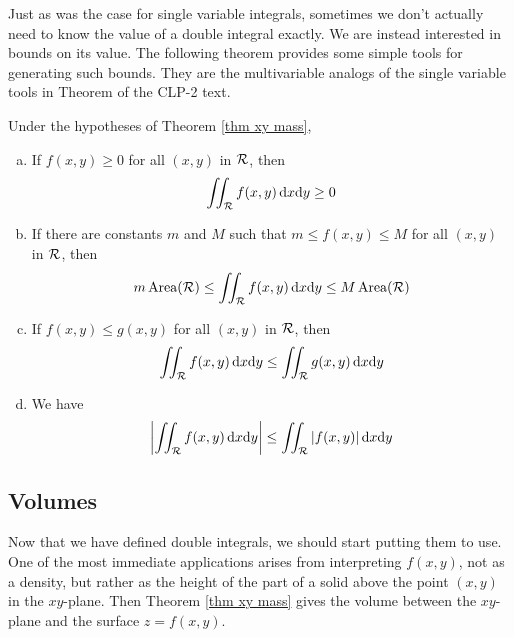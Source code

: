 Just as was the case for single variable integrals, sometimes we don't
actually need to know the value of a double integral exactly. We are
instead interested in bounds on its value. 
The following theorem provides some simple tools for generating such bounds.
They are the multivariable analogs of the single variable tools in
Theorem  of the CLP-2 text.  


\begin{theorem}\label{thm:INT2dineq}
Under the hypotheses of Theorem \ref{thm xy mass},
\begin{enumerate}[(a)]
\item 
If $f(x,y)\ge 0$ for all $(x,y)$ in $\mathcal{R}$, then
\begin{align*}
\iint_{\mathcal{R}} f(x,y)\,\mathrm{d}x\mathrm{d}y \ge 0
\end{align*}
\item 
If there are constants $m$ and $M$ such that  $m\le f(x,y)\le M$ 
for all $(x,y)$ in $\mathcal{R}$, then
\begin{align*}
m\,\text{Area}(\mathcal{R})\le \iint_{\mathcal{R}} f(x,y)\,\mathrm{d}x\mathrm{d}y 
                                   \le M\,\text{Area}(\mathcal{R})
\end{align*}
\item If $f(x,y)\le g(x,y)$ for all $(x,y)$ in $\mathcal{R}$, then
\begin{align*}
\iint_{\mathcal{R}} f(x,y)\,\mathrm{d}x\mathrm{d}y \le \iint_{\mathcal{R}} g(x,y)\,\mathrm{d}x\mathrm{d}y
\end{align*}
\item We have
\begin{align*}
\left|\iint_{\mathcal{R}} f(x,y)\,\mathrm{d}x\mathrm{d}y\right|
          \le \iint_{\mathcal{R}} |f(x,y)|\,\mathrm{d}x\mathrm{d}y
\end{align*}
\end{enumerate}
\end{theorem}




\subsection{Volumes}

Now that we have defined double integrals, we should start putting them to use.
One of the most immediate applications arises from interpreting $f(x,y)$,
not as a density, but rather as the height of the part of a solid above the 
point $(x,y)$ in the $xy$-plane. Then Theorem \ref{thm xy mass} gives 
the volume between the $xy$-plane and the surface $z=f(x,y)$. 


